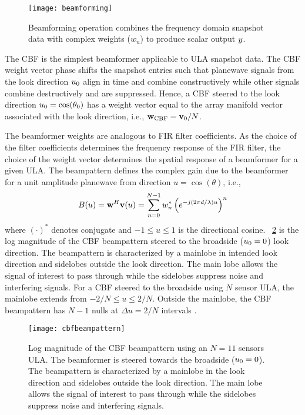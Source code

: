 \begin{figure} \centering
    \texttt{[image: beamforming]}
    \caption[Beamforming operation flow diagram]{Beamforming operation combines the frequency domain snapshot data with complex weights ($w_n$) to produce scalar output $y$.}
    \label{fig:beamformer}
\end{figure}

The CBF is the simplest beamformer applicable to ULA snapshot
data. The CBF weight vector phase shifts the snapshot entries such
that planewave signals from the look direction $u_0$ align in time
and combine constructively while other signals combine destructively
and are suppressed. Hence, a CBF steered to the look direction
$u_0 = \cos(\theta_0)$ has a weight vector equal to the array
manifold vector associated with the look direction, i.e.,
${\bf w}_{\rm CBF} = {\bf v}_0/N$.

The beamformer weights are analogous to FIR filter coefficients. As
the choice of the filter coefficients determines the frequency
response of the FIR filter, the choice of the weight vector determines
the spatial response of a beamformer for a given ULA. The beampattern
defines the complex gain due to the beamformer for a unit amplitude
planewave from direction $u = \cos(\theta)$, i.e.,
\begin{equation}
  \label{eq:beampatu} 
  B(u) = {\bf w}^H{\bf v}(u) = \sum_{n=0}^{N-1}w_n^*\left(e^{-j(2\pi d /\lambda) u}\right)^n
\end{equation}
where $(\cdot)^*$ denotes conjugate and $-1 \leq u \leq 1$ is the
directional cosine. \figurename{}~\ref{fig:cbf_bp} is the log
magnitude of the CBF beampattern steered to the broadside
($u_0 = 0$) look direction. The beampattern is characterized by a
mainlobe in intended look direction and sidelobes outside the look
direction. The main lobe allows the signal of interest to pass through
while the sidelobes suppress noise and interfering signals. For a CBF
steered to the broadside using $N$ sensor ULA, the mainlobe extends
from $-2/N \leq u \leq 2/N$. Outside the mainlobe, the CBF beampattern
has $N - 1$ nulls at $\Delta u = 2/N$ intervals \cite{vtree2002oap}.
\begin{figure} \centering
    \texttt{[image: cbfbeampattern]}
    \caption[CBF beampattern using $N=11$ sensor ULA]{Log magnitude of the CBF beampattern using an $N=11$
      sensors ULA. The beamformer is steered towards the broadside
      ($u_0=0$). The beampattern is characterized by a mainlobe in
      the look direction and sidelobes outside the look direction. The
      main lobe allows the signal of interest to pass through while
      the sidelobes suppress noise and interfering signals.}
    \label{fig:cbf_bp}
\end{figure}

